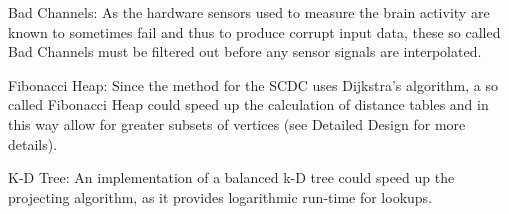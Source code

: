 \begin{aims}
	\item[\hspace*{11mm} Bad Channels:] 
As the hardware sensors used to measure the brain activity are known to sometimes fail and thus to produce corrupt input data, these so called Bad Channels must be filtered out before any sensor signals are interpolated.
\end{aims}

\begin{aims}
	\item[\hspace*{11mm} Fibonacci Heap:] 
Since the method for the SCDC uses Dijkstra's algorithm, a so called Fibonacci Heap could speed up the calculation of distance tables and in this way allow for greater subsets of vertices (see Detailed Design for more details).
\end{aims}

\begin{aims}
	\item[\hspace*{11mm} K-D Tree:] 
An implementation of a balanced k-D tree could speed up the projecting algorithm, as it provides logarithmic run-time for lookups.
\end{aims}